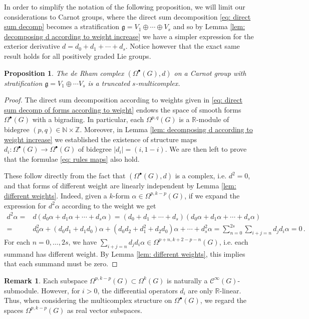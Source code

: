 \documentclass[dvipsnames]{amsart}
\newtheorem{proposition}[theorem]{Proposition}
\theoremstyle{definition}
\newtheorem{remark}[theorem]{Remark}
\theoremstyle{definition}
\numberwithin{equation}{section}
\newcommand{\N}{\mathbb{N}}
\newcommand{\Z}{\mathbb{Z}}
\begin{document}
In order to simplify the notation of the following proposition, we will limit our considerations to Carnot groups, where the direct sum decomposition \eqref{eq: direct sum decomp} becomes a stratification $\mathfrak{g}=V_1\oplus\cdots\oplus V_s$ and so by Lemma \ref{lem: decomposing d according to weight increase} we have a simpler expression for the exterior derivative $d=d_0+d_1+\cdots+d_s$. Notice however that the exact same result holds for all positively graded Lie groups.
\begin{proposition}
    The de Rham complex $(\Omega^\bullet(G),d)$ on a Carnot group with stratification $\mathfrak{g}=V_1\oplus\cdots V_s$ is a truncated $s$-multicomplex.
\end{proposition}
\begin{proof}
    The direct sum decomposition according to weights given in \eqref{eq: direct sum decomp of forms according to weight} endows the space of smooth forms $\Omega^\bullet(G)$ with a bigrading. In particular, each $\Omega^{p,q}(G)$ is a $\mathbb R$-module of bidegree $(p,q)\in\N\times\Z$. Moreover, in Lemma \ref{lem: decomposing d according to weight increase} we established the existence of structure maps $d_i\colon\Omega^\bullet(G)\to\Omega^\bullet(G)$ of bidegree $\vert d_i\vert=(i,1-i)$. We are then left to prove that the formulae \eqref{eq: rules maps} also hold.

    These follow directly from the fact that $(\Omega^\bullet(G),d)$ is a complex, i.e. $d^2=0$, and that forms of different weight are linearly independent by Lemma \ref{lem: different weights}. Indeed, given a $k$-form $\alpha\in\Omega^{p,k-p}(G)$, if we expand the expression for $d^2\alpha$ according to the weight we get
    \begin{align*}
        d^2\alpha=&d(d_0\alpha+d_1\alpha+\cdots+d_s\alpha)=(d_0+d_1+\cdots+d_s)(d_0\alpha+d_1\alpha+\cdots+d_s\alpha)\\=&d_0^2\alpha+(d_0d_1+d_1d_0)\alpha+(d_0d_2+d_1^2+d_2d_0)\alpha+\cdots+d_s^2\alpha=\sum_{n=0}^{2s}\sum_{i+j=n}d_jd_i\alpha=0\,.
    \end{align*}
    For each $n=0,\ldots,2s$, we have $\sum_{i+j=n}d_jd_i\alpha\in\Omega^{p+n,k+2-p-n}(G)$, i.e. each summand has different weight. By Lemma \ref{lem: different weights}, this implies that each summand must be zero.
\end{proof}

\begin{remark}
    Each subspace $\Omega^{p,k-p}(G)\subset\Omega^k(G)$ is naturally a $\mathcal C^\infty(G)$-submodule. However, for $i>0$, the differential operators $d_i$ are only $\mathbb R$-linear. Thus, when considering the multicomplex structure on $\Omega^\bullet(G)$, we regard the spaces $\Omega^{p,k-p}(G)$ as real vector subspaces.
\end{remark}
\end{document}
